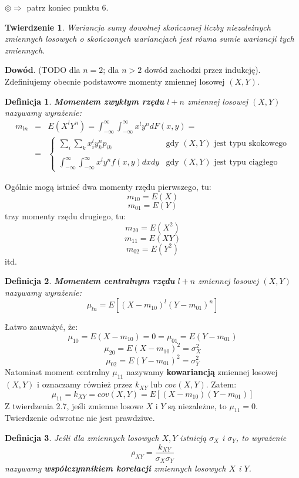 \documentclass[10pt,a4paper]{article}
\newtheorem{definition}{Definicja}[section]
\newtheorem{theorem}{Twierdzenie}[section]
\begin{document}
$\circledcirc\Longrightarrow$ patrz koniec punktu 6.
\begin{theorem}
Wariancja sumy dowolnej skończonej liczby niezależnych zmiennych losowych o skończonych wariancjach jest równa sumie wariancji tych zmiennych.
\end{theorem}
\textbf{Dowód}. (TODO dla $n=2$; dla $n>2$ dowód zachodzi przez indukcję).\newline\\
Zdefiniujemy obecnie podstawowe momenty zmiennej losowej $(X, Y)$.
\begin{definition}
\textbf{Momentem zwykłym rzędu} $l+n$ zmiennej losowej $(X, Y)$ nazywamy wyrażenie:
\begin{eqnarray}
m_{ln} &=& E(X^lY^n) = \int_{-\infty}^\infty\int_{-\infty}^\infty x^ly^ndF(x,y) = \\\nonumber
&=& \left\{ \begin{array}{ll}
\sum_i\sum_kx_i^ly_k^np_{ik} & \textrm{gdy $(X,Y)$ jest typu skokowego} \\\nonumber\\\nonumber
\int_{-\infty}^\infty\int_{-\infty}^\infty x^ly^nf(x,y)dxdy& \textrm{gdy $(X,Y)$ jest typu ciągłego} 
\end{array}\right.
\end{eqnarray} 
\end{definition}
Ogólnie mogą istnieć dwa momenty rzędu pierwszego, tu:
\[m_{10} = E(X)\]
\[m_{01} = E(Y)\]
trzy momenty rzędu drugiego, tu:
\[m_{20} = E(X^2)\]
\[m_{11} = E(XY)\]
\[m_{02} = E(Y^2)\]
itd.
\begin{definition}
\textbf{Momentem centralnym rzędu} $l+n$ zmiennej losowej $(X,Y)$ nazywamy wyrażenie:
\begin{equation}
\mu_{ln} = E[(X-m_{10})^l(Y-m_{01})^n]
\end{equation}
\end{definition}
Łatwo zauważyć, że:
\[\mu_{10} = E(X-m_{10}) = 0 = \mu_{01} = E(Y-m_{01}) \]
\[\mu_{20} = E(X-m_{10})^2 = \sigma_X^2\]
\[\mu_{02} = E(Y-m_{01})^2 = \sigma_Y^2\]
Natomiast moment centralny $\mu_{11}$ nazywamy \textbf{kowariancją} zmiennej losowej $(X,Y)$ i oznaczamy również przez $k_{XY}$ lub $cov(X,Y)$.
Zatem:
\[\mu_{11} = k_{XY} = cov(X,Y) = E[(X-m_{10})(Y-m_{01})]\]
Z twierdzenia 2.7, jeśli zmienne losowe $X$ i $Y$ są niezależne, to $\mu_{11} = 0$. Twierdzenie odwrotne nie jest prawdziwe.
\begin{definition}
Jeśli dla zmiennych losowych $X, Y$ istnieją $\sigma_X$ i $\sigma_Y$, to wyrażenie
\begin{equation}
\rho_{XY} = \frac{k_{XY}}{\sigma_X\sigma_Y}
\end{equation}
nazywamy \textbf{współczynnikiem korelacji} zmiennych losowych $X$ i $Y$.
\end{definition}
\end{document}
